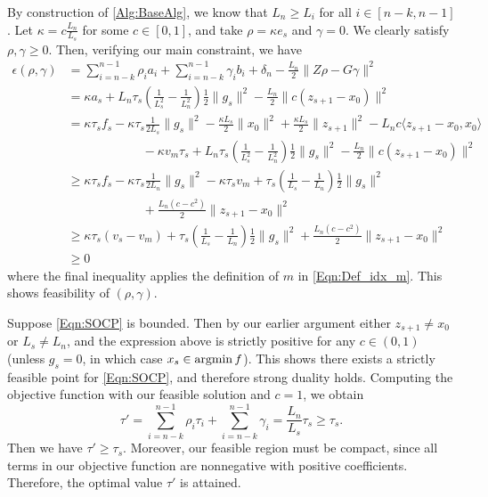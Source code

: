 \documentclass[11pt]{article}
\numberwithin{equation}{section}
\newcommand{\argmin}{\operatornamewithlimits{argmin}}
\newcommand{\Ucoef}{\rho}
\newcommand{\Wcoef}{\gamma}
\newcommand{\idxArgmin}{m}
\newcommand{\idxLastSuccess}{s}
\newcommand{\idxMem}{k}
\newcommand{\epsFunc}{\epsilon(\Ucoef, \Wcoef)}
\newcommand{\dotp}[2]{\langle {#1}, {#2} \rangle}
\newcommand{\ip}[2]{\sum_{i={n-\idxMem}}^{n-1} {#1}_i {#2}_i}
\newcommand{\fullSum}[1]{\sum_{i={n-\idxMem}}^{n-1} {#1}_i}
\newcommand{\norm}[1]{\|{#1}\|}
\theoremstyle{definition}
\theoremstyle{plain}
\theoremstyle{definition}
\begin{document}
By construction of \cref{Alg:BaseAlg}, we know that $L_n \geq L_i$ for all $i \in [n-k,n-1]$. Let $\kappa = c \frac{L_n}{L_\idxLastSuccess}$ for some $c \in [0,1]$, and take $\Ucoef = \kappa e_\idxLastSuccess$ and $\Wcoef = 0$. We clearly satisfy $\Ucoef, \Wcoef \geq 0$. Then, verifying our main constraint, we have
\begin{align*}
    \epsFunc &= \ip{\Ucoef}{a} + \ip{\Wcoef}{b} +  \delta_n - \frac{L_n}{2} \norm{Z \Ucoef - G \Wcoef}^2 \\
    & = \kappa a_\idxLastSuccess + L_n \tau_\idxLastSuccess\left(\frac{1}{L_\idxLastSuccess^2} - \frac{1}{L_n^2}\right) \frac{1}{2}\norm{g_\idxLastSuccess}^2 - \frac{L_n}{2}\norm{c(z_{\idxLastSuccess+1} - x_0)}^2 \\
    & = \kappa \tau_\idxLastSuccess f_\idxLastSuccess - \kappa \tau_\idxLastSuccess \frac{1}{2L_\idxLastSuccess}\norm{g_\idxLastSuccess}^2 - \frac{\kappa L_\idxLastSuccess}{2}\norm{x_0}^2 + \frac{\kappa L_\idxLastSuccess}{2}\norm{z_{\idxLastSuccess+1}}^2 - L_n c \dotp{z_{\idxLastSuccess+1} - x_0}{x_0} \\
    & \qquad \qquad \qquad - \kappa v_\idxArgmin \tau_\idxLastSuccess + L_n \tau_\idxLastSuccess \left(\frac{1}{L_\idxLastSuccess^2} - \frac{1}{L_n^2}\right) \frac{1}{2}\norm{g_\idxLastSuccess}^2 - \frac{L_n}{2}\norm{c(z_{\idxLastSuccess+1} - x_0)}^2 \\
    & \geq \kappa \tau_\idxLastSuccess f_\idxLastSuccess -  \kappa \tau_\idxLastSuccess \frac{1}{2L_n}\norm{g_\idxLastSuccess}^2 - \kappa \tau_\idxLastSuccess v_\idxArgmin + \tau_\idxLastSuccess \left(\frac{1}{L_\idxLastSuccess} - \frac{1}{L_n} \right) \frac{1}{2}\|g_\idxLastSuccess\|^2 \\
    & \qquad \qquad \qquad + \frac{L_n (c-c^2)}{2} \|z_{\idxLastSuccess+1} - x_0\|^2 \\
    & \geq \kappa \tau_\idxLastSuccess (v_\idxLastSuccess - v_\idxArgmin) + \tau_\idxLastSuccess \left(\frac{1}{L_\idxLastSuccess} - \frac{1}{L_n} \right) \frac{1}{2}\|g_\idxLastSuccess\|^2 + \frac{L_n (c-c^2)}{2} \|z_{\idxLastSuccess+1} - x_0\|^2\\
    & \geq 0
\end{align*}
where the final inequality applies the definition of $\idxArgmin$ in \eqref{Eqn:Def_idx_m}.
This shows feasibility of $(\Ucoef, \Wcoef)$.

Suppose \eqref{Eqn:SOCP} is bounded. Then by our earlier argument either $z_{\idxLastSuccess+1} \neq x_0$ or $L_s \neq L_n$, and the expression above is strictly positive for any $c \in (0,1)$ (unless $g_s = 0$, in which case $x_s \in \argmin f$). This shows there exists a strictly feasible point for \eqref{Eqn:SOCP}, and therefore strong duality holds.
Computing the objective function with our feasible solution and $c=1$, we obtain
\begin{equation*}
    \tau' = \ip{\Ucoef}{\tau} + \fullSum{\Wcoef} = \frac{L_n}{L_\idxLastSuccess} \tau_\idxLastSuccess \geq \tau_\idxLastSuccess .
\end{equation*}
Then we have $\tau' \geq \tau_\idxLastSuccess$. Moreover, our feasible region must be compact, since all terms in our objective function are nonnegative with positive coefficients. Therefore, the optimal value $\tau'$ is attained.
\end{document}
